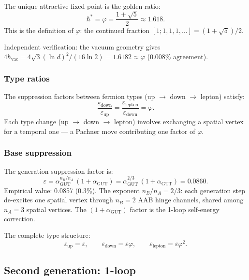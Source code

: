The unique attractive fixed point is the golden ratio:
\begin{equation}
\hbar^* = \varphi = \frac{1 + \sqrt{5}}{2} \approx 1.618.
\end{equation}
This is the definition of $\varphi$: the continued fraction $[1; 1, 1, 1, \ldots] = (1+\sqrt{5})/2$.

Independent verification: the vacuum geometry gives $4\hbar_\text{vac} = 4\sqrt{3}(\ln d)^2/(16\ln 2) = 1.6182 \approx \varphi$ (0.008\% agreement).

\subsubsection{Type ratios}

The suppression factors between fermion types (up $\to$ down $\to$ lepton) satisfy:
\begin{equation}
\frac{\varepsilon_\text{down}}{\varepsilon_\text{up}} = \frac{\varepsilon_\text{lepton}}{\varepsilon_\text{down}} = \varphi.
\end{equation}
Each type change (up $\to$ down $\to$ lepton) involves exchanging a spatial vertex for a temporal one --- a Pachner move contributing one factor of $\varphi$.

\subsubsection{Base suppression}

The generation suppression factor is:
\begin{equation}
\varepsilon = \alpha_\text{GUT}^{n_B/n_A}\,(1 + \alpha_\text{GUT}) = \alpha_\text{GUT}^{2/3}\,(1 + \alpha_\text{GUT}) = 0.0860.
\end{equation}
Empirical value: 0.0857 (0.3\%). The exponent $n_B/n_A = 2/3$: each generation step de-excites one spatial vertex through $n_B = 2$ AAB hinge channels, shared among $n_A = 3$ spatial vertices. The $(1 + \alpha_\text{GUT})$ factor is the 1-loop self-energy correction.

The complete type structure:
\begin{equation}
\varepsilon_\text{up} = \varepsilon, \qquad \varepsilon_\text{down} = \varepsilon\varphi, \qquad \varepsilon_\text{lepton} = \varepsilon\varphi^2.
\end{equation}

\subsection{Second generation: 1-loop}


